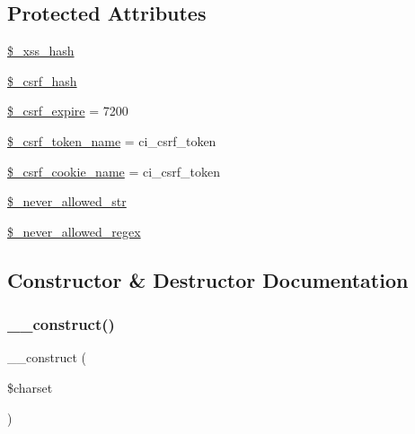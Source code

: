 \subsection*{Protected Attributes}
\begin{DoxyCompactItemize}
\item 
\mbox{\hyperlink{class_c_i___security_aca426a0e87199bfa36c7401a1d06a419}{\$\+\_\+xss\+\_\+hash}}
\item 
\mbox{\hyperlink{class_c_i___security_a8bf24cc529f04164ac20d892ce20d721}{\$\+\_\+csrf\+\_\+hash}}
\item 
\mbox{\hyperlink{class_c_i___security_af86a83f20de2a3c522bf690d4080c08e}{\$\+\_\+csrf\+\_\+expire}} = 7200
\item 
\mbox{\hyperlink{class_c_i___security_a6752ebca4be235c079785a87a693d932}{\$\+\_\+csrf\+\_\+token\+\_\+name}} = \textquotesingle{}ci\+\_\+csrf\+\_\+token\textquotesingle{}
\item 
\mbox{\hyperlink{class_c_i___security_a52043f2c9ffb0e14eade8e67a0172a82}{\$\+\_\+csrf\+\_\+cookie\+\_\+name}} = \textquotesingle{}ci\+\_\+csrf\+\_\+token\textquotesingle{}
\item 
\mbox{\hyperlink{class_c_i___security_ab883fab930a1c4a926eaa501ab211823}{\$\+\_\+never\+\_\+allowed\+\_\+str}}
\item 
\mbox{\hyperlink{class_c_i___security_ac502ee17d09eb8bbd70a6fb1f9515503}{\$\+\_\+never\+\_\+allowed\+\_\+regex}}
\end{DoxyCompactItemize}


\subsection{Constructor \& Destructor Documentation}
\mbox{\label{class_c_i___security_aeee5dda3eeba2574642a18f281a4832c}} 
\subsubsection{\texorpdfstring{\+\_\+\+\_\+construct()}{\_\_construct()}}
{\footnotesize\ttfamily \+\_\+\+\_\+construct (\begin{DoxyParamCaption}\item[{}]{\$charset }\end{DoxyParamCaption})}

